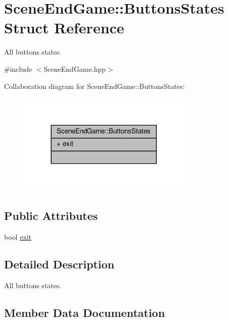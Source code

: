 \hypertarget{struct_scene_end_game_1_1_buttons_states}{}\section{Scene\+End\+Game\+:\+:Buttons\+States Struct Reference}
\label{struct_scene_end_game_1_1_buttons_states}


All buttons states.  




{\ttfamily \#include $<$Scene\+End\+Game.\+hpp$>$}



Collaboration diagram for Scene\+End\+Game\+:\+:Buttons\+States\+:
\nopagebreak
\begin{figure}[H]
\begin{center}
\leavevmode
\includegraphics[width=236pt]{struct_scene_end_game_1_1_buttons_states__coll__graph}
\end{center}
\end{figure}
\subsection*{Public Attributes}
\begin{DoxyCompactItemize}
\item 
bool \hyperlink{struct_scene_end_game_1_1_buttons_states_a7e876bf38fa9a782a44abb5fe38c0a6e}{exit}
\end{DoxyCompactItemize}


\subsection{Detailed Description}
All buttons states. 

\subsection{Member Data Documentation}
\mbox{\label{struct_scene_end_game_1_1_buttons_states_a7e876bf38fa9a782a44abb5fe38c0a6e}} 

